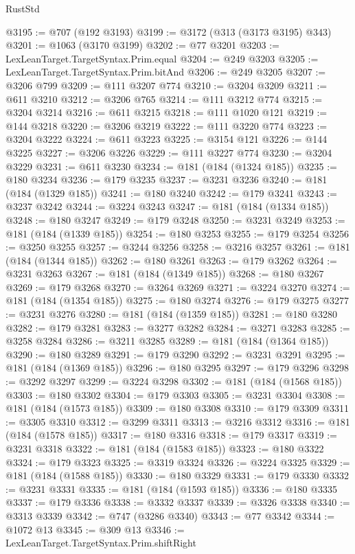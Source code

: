 \begin{lexlean}{RustStd}
\begin{coremodule}
@3195 := @707 (@192 @3193)
@3199 := @3172 (@313 (@3173 @3195) @343)
@3201 := @1063 (@3170 @3199)
@3202 := @77 @3201
@3203 := LexLeanTarget.TargetSyntax.Prim.equal
@3204 := @249 @3203
@3205 := LexLeanTarget.TargetSyntax.Prim.bitAnd
@3206 := @249 @3205
@3207 := @3206 @799
@3209 := @111 @3207 @774
@3210 := @3204 @3209
@3211 := @611 @3210
@3212 := @3206 @765
@3214 := @111 @3212 @774
@3215 := @3204 @3214
@3216 := @611 @3215
@3218 := @111 @1020 @121
@3219 := @144 @3218
@3220 := @3206 @3219
@3222 := @111 @3220 @774
@3223 := @3204 @3222
@3224 := @611 @3223
@3225 := @3154 @121
@3226 := @144 @3225
@3227 := @3206 @3226
@3229 := @111 @3227 @774
@3230 := @3204 @3229
@3231 := @611 @3230
@3234 := @181 (@184 (@1324 @185))
@3235 := @180 @3234
@3236 := @179 @3235
@3237 := @3231 @3236
@3240 := @181 (@184 (@1329 @185))
@3241 := @180 @3240
@3242 := @179 @3241
@3243 := @3237 @3242
@3244 := @3224 @3243
@3247 := @181 (@184 (@1334 @185))
@3248 := @180 @3247
@3249 := @179 @3248
@3250 := @3231 @3249
@3253 := @181 (@184 (@1339 @185))
@3254 := @180 @3253
@3255 := @179 @3254
@3256 := @3250 @3255
@3257 := @3244 @3256
@3258 := @3216 @3257
@3261 := @181 (@184 (@1344 @185))
@3262 := @180 @3261
@3263 := @179 @3262
@3264 := @3231 @3263
@3267 := @181 (@184 (@1349 @185))
@3268 := @180 @3267
@3269 := @179 @3268
@3270 := @3264 @3269
@3271 := @3224 @3270
@3274 := @181 (@184 (@1354 @185))
@3275 := @180 @3274
@3276 := @179 @3275
@3277 := @3231 @3276
@3280 := @181 (@184 (@1359 @185))
@3281 := @180 @3280
@3282 := @179 @3281
@3283 := @3277 @3282
@3284 := @3271 @3283
@3285 := @3258 @3284
@3286 := @3211 @3285
@3289 := @181 (@184 (@1364 @185))
@3290 := @180 @3289
@3291 := @179 @3290
@3292 := @3231 @3291
@3295 := @181 (@184 (@1369 @185))
@3296 := @180 @3295
@3297 := @179 @3296
@3298 := @3292 @3297
@3299 := @3224 @3298
@3302 := @181 (@184 (@1568 @185))
@3303 := @180 @3302
@3304 := @179 @3303
@3305 := @3231 @3304
@3308 := @181 (@184 (@1573 @185))
@3309 := @180 @3308
@3310 := @179 @3309
@3311 := @3305 @3310
@3312 := @3299 @3311
@3313 := @3216 @3312
@3316 := @181 (@184 (@1578 @185))
@3317 := @180 @3316
@3318 := @179 @3317
@3319 := @3231 @3318
@3322 := @181 (@184 (@1583 @185))
@3323 := @180 @3322
@3324 := @179 @3323
@3325 := @3319 @3324
@3326 := @3224 @3325
@3329 := @181 (@184 (@1588 @185))
@3330 := @180 @3329
@3331 := @179 @3330
@3332 := @3231 @3331
@3335 := @181 (@184 (@1593 @185))
@3336 := @180 @3335
@3337 := @179 @3336
@3338 := @3332 @3337
@3339 := @3326 @3338
@3340 := @3313 @3339
@3342 := @747 (@3286 @3340)
@3343 := @77 @3342
@3344 := @1072 @13
@3345 := @309 @13
@3346 := LexLeanTarget.TargetSyntax.Prim.shiftRight

\end{coremodule}
\end{lexlean}
